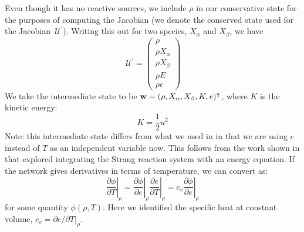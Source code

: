 \documentclass[times,modern]{aastex63}
\newcommand{\Uc}{{\,\bm{\mathcal{U}}}}
\begin{document}
Even though it has no reactive sources, we include $\rho$ in our conservative state
for the purposes of computing the Jacobian (we denote the conserved state used for the
Jacobian $\Uc^\prime$).
Writing this out for two species, $X_\alpha$ and $X_\beta$, we have
\begin{equation}
\Uc^\prime = \left ( \begin{array}{c} \rho \\ \rho X_\alpha \\ \rho X_\beta \\ \rho E \\ \rho e \end{array} \right )
\end{equation}
We take the intermediate state to be ${\bf w} = (\rho, X_\alpha, X_\beta,
K, e)^\intercal$, where $K$ is the kinetic energy:
\begin{equation}
K = \frac{1}{2} u^2
\end{equation}
Note: this intermediate state differs from what we used in \citet{castro_sdc} in that
we are using $e$ instead of $T$ as an independent variable now.  This follows from
the work shown in \citet{strang_rnaas} that explored integrating the Strang
reaction system with an energy equation.  If the network gives derivatives in terms
of temperature, we can convert as:
\begin{equation}
\left . \frac{\partial \phi}{\partial T} \right |_\rho =
  \left . \frac{\partial \phi}{\partial e} \right |_\rho 
  \left . \frac{\partial e}{\partial T} \right |_\rho =
  c_v \left . \frac{\partial \phi}{\partial e} \right |_\rho
\end{equation}
for some quantity $\phi(\rho, T)$.  Here we identified the specific heat
at constant volume, $c_v = \partial e/\partial T|_\rho$.
\end{document}
